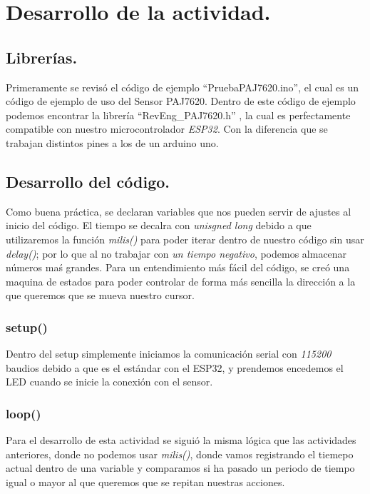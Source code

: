 \documentclass[conference]{IEEEtran}
\begin{document}
\section{Desarrollo de la actividad.}
  \subsection{Librerías.}
  Primeramente se revisó el código de ejemplo ``PruebaPAJ7620.ino'', el cual es un código de ejemplo de uso del Sensor PAJ7620. Dentro de este código de ejemplo podemos encontrar la librería ``RevEng\_PAJ7620.h'' \cite{crandall_reveng_paj7620},  la cual es perfectamente compatible con nuestro microcontrolador \textit{ESP32}. Con la diferencia que se trabajan distintos pines a los de un arduino uno.

  
  \subsection{Desarrollo del código.}
  Como buena práctica, se declaran variables que nos pueden servir de ajustes al inicio del código. El tiempo se decalra con \textit{unisgned long} debido a que utilizaremos la función \textit{milis()} para poder iterar dentro de nuestro código sin usar \textit{delay()}; por lo que al no trabajar con \textit{un tiempo negativo}, podemos almacenar números maś grandes.
  Para un entendimiento más fácil del código, se creó una maquina de estados \cite{luisllamas_fsm_arduino} para poder controlar de forma más sencilla la dirección a la que queremos que se mueva nuestro cursor.

  \subsubsection{setup()}
  Dentro del setup simplemente iniciamos la comunicación serial con \textit{115200} baudios debido a que es el estándar con el ESP32, y prendemos encedemos el LED cuando se inicie la conexión con el sensor.

  \subsubsection{loop()}
  Para el desarrollo de esta actividad se siguió la misma lógica que las actividades anteriores, donde no podemos usar \textit{milis()}, donde vamos registrando el tiemepo actual dentro de una variable y comparamos si ha pasado un periodo de tiempo igual o mayor al que queremos que se repitan nuestras acciones. 
\end{document}
